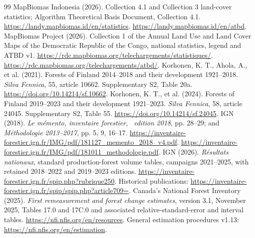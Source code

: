 \documentclass[11pt,a4paper]{article}
\begin{document}
\begin{thebibliography}{99}
 MapBiomas Indonesia (2026). Collection 4.1 and Collection 3 land-cover statistics; Algorithm Theoretical Basis Document, Collection 4.1. \url{https://landy.mapbiomas.id/en/statistics}. \url{https://landy.mapbiomas.id/en/atbd}.
 MapBiomas Project (2026). Collection 1 of the Annual Land Use and Land Cover Maps of the Democratic Republic of the Congo, national statistics, legend and ATBD v1. \url{https://rdc.mapbiomas.org/telechargements/statistiques/}. \url{https://rdc.mapbiomas.org/telechargements/atbd/}.
 Korhonen, K. T., Ahola, A., et al. (2021). Forests of Finland 2014--2018 and their development 1921--2018. \emph{Silva Fennica}, 55, article 10662. Supplementary S2, Table 20a. \url{https://doi.org/10.14214/sf.10662}.
 Korhonen, K. T., et al. (2024). Forests of Finland 2019--2023 and their development 1921--2023. \emph{Silva Fennica}, 58, article 24045. Supplementary S2, Table 55. \url{https://doi.org/10.14214/sf.24045}.
 IGN (2018). \emph{Le m\'emento, inventaire forestier, \ edition 2018}, pp. 28--29; and \emph{M\'ethodologie 2013--2017}, pp. 5, 9, 16--17. \url{https://inventaire-forestier.ign.fr/IMG/pdf/181127_memento_2018_v4.pdf}. \url{https://inventaire-forestier.ign.fr/IMG/pdf/181011_methodologie.pdf}.
 IGN (2026). \emph{R\'esultats nationaux}, standard production-forest volume tables, campaigns 2021--2025, with retained 2018--2022 and 2019--2023 editions. \url{https://inventaire-forestier.ign.fr/spip.php?rubrique250}. Historical publications: \url{https://inventaire-forestier.ign.fr/spip/spip.php?article709=}.
 Canada's National Forest Inventory (2025). \emph{First remeasurement and forest change estimates}, version 3.1, November 2025, Tables 17.0 and 17C.0 and associated relative-standard-error and interval tables. \url{https://nfi.nfis.org/en/resources}. General estimation procedures v1.13: \url{https://nfi.nfis.org/en/estimation}.

\end{thebibliography}
\end{document}
